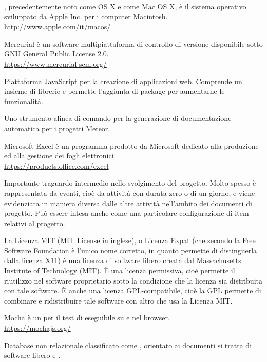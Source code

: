 \Macos, precedentemente noto come OS X e come Mac OS X, è il sistema operativo sviluppato da Apple Inc. per i computer Macintosh.\\
\url{http://www.apple.com/it/macos/}

Mercurial è un software multipiattaforma di controllo di versione disponibile sotto GNU General Public License 2.0.\\
\url{https://www.mercurial-scm.org/}

Piattaforma JavaScript per la creazione di applicazioni web. Comprende un insieme di librerie e permette l'aggiunta di package per aumentarne le funzionalità.

Uno strumento alinea di comando per la generazione di documentazione automatica per i progetti Meteor.

Microsoft Excel è un programma prodotto da Microsoft dedicato alla produzione ed alla gestione dei fogli elettronici.\\
\url{https://products.office.com/excel}

Importante traguardo intermedio nello svolgimento del progetto. Molto spesso è rappresentata da eventi, cioè da attività con durata zero o di un giorno, e viene evidenziata in maniera diversa dalle altre attività nell'ambito dei documenti di progetto. Può essere intesa anche come una particolare configurazione di item relativi al progetto.

La Licenza MIT (MIT License in inglese), o Licenza Expat (che secondo la Free Software Foundation è l'unico nome corretto, in quanto permette di distinguerla dalla licenza X11) è una licenza di software libero creata dal Massachusetts Institute of Technology (MIT). \`{E} una licenza permissiva, cioè permette il riutilizzo nel software proprietario sotto la condizione che la licenza sia distribuita con tale software. \`{E} anche una licenza GPL-compatibile, cioè la GPL permette di combinare e ridistribuire tale software con altro che usa la Licenza MIT.

Mocha è un  per il test di  eseguibile su  e nel browser.\\
\url{https://mochajs.org/}

Database non relazionale classificato come , orientato ai documenti si tratta di software libero e .
\clearpage
